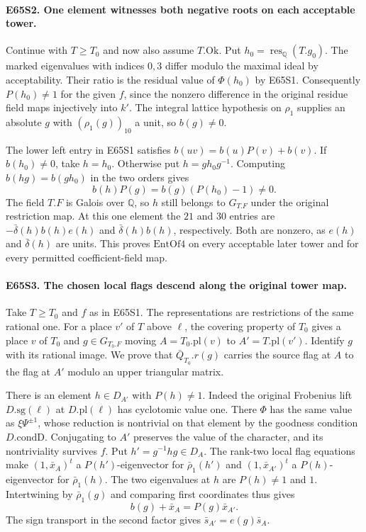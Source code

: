 \paragraph{E65S2. One element witnesses both negative roots on each acceptable tower.}
Continue with $T\ge T_0$ and now also assume $T.\mathrm{Ok}$. Put
$h_0=\operatorname{res}_{\mathbb Q}(T.g_0)$. The marked eigenvalues
with indices $0,3$ differ modulo the maximal ideal by acceptability.
Their ratio is the residual value of $\Phi(h_0)$ by E65S1.
Consequently $P(h_0)\ne1$ for the given $f$, since the nonzero
difference in the original residue field maps injectively into $k'$.
The integral lattice hypothesis on $\rho_1$ supplies an absolute $g$
with $(\rho_1(g))_{10}$ a unit, so $b(g)\ne0$.

The lower left entry in E65S1 satisfies
$b(uv)=b(u)P(v)+b(v)$. If $b(h_0)\ne0$, take $h=h_0$. Otherwise
put $h=gh_0g^{-1}$. Computing $b(hg)=b(gh_0)$ in the two orders gives
\[
           b(h)P(g)=b(g)(P(h_0)-1)\ne0 .
\]
The field $T.F$ is Galois over $\mathbb Q$, so $h$ still belongs to
$G_{T.F}$ under the original restriction map. At this one element the
$21$ and $30$ entries are $-\bar\delta(h)b(h)e(h)$ and
$\bar\delta(h)b(h)$, respectively. Both are nonzero, as $e(h)$ and
$\bar\delta(h)$ are units. This proves $\mathrm{EntOf4}$ on every
acceptable later tower and for every permitted coefficient-field map.

\paragraph{E65S3. The chosen local flags descend along the original tower map.}
Take $T\ge T_0$ and $f$ as in E65S1. The representations are
restrictions of the same rational one. For a place $v'$ of $T$ above
$\ell$, the covering property of $T_0$ gives a place $v$ of $T_0$
and $g\in G_{T_0.F}$ moving $A=T_0.\mathrm{pl}(v)$ to
$A'=T.\mathrm{pl}(v')$. Identify $g$ with its rational image.
We prove that $\bar Q_{T_0}.r(g)$ carries the source flag at $A$
to the flag at $A'$ modulo an upper triangular matrix.

There is an element $h\in D_{A'}$ with $P(h)\ne1$. Indeed the
original Frobenius lift $D.\mathrm{sg}(\ell)$ at $D.\mathrm{pl}(\ell)$
has cyclotomic value one. There $\Phi$ has the same value as
$\xi\Psi^{\pm1}$, whose reduction is nontrivial on that element by
the goodness condition $D.\mathrm{condD}$. Conjugating to $A'$
preserves the value of the character, and its nontriviality survives
$f$. Put $h'=g^{-1}hg\in D_A$. The rank-two local flag equations
make $(1,\bar x_A)^t$ a $P(h')$-eigenvector for $\bar\rho_1(h')$
and $(1,\bar x_{A'})^t$ a $P(h)$-eigenvector for $\bar\rho_1(h)$.
The two eigenvalues at $h$ are $P(h)\ne1$ and $1$. Intertwining
by $\bar\rho_1(g)$ and comparing first coordinates thus gives
\[
             b(g)+\bar x_A=P(g)\bar x_{A'} .
\]
The sign transport in the second factor gives
$\bar s_{A'}=e(g)\bar s_A$.


